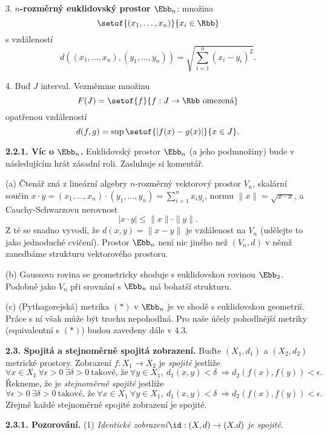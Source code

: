 \documentclass[12pt]{article}
\begin{document}
{ \smallskip
 
 3. {\bf $n$-rozměrný euklidovský prostor $\Ebb_n$}: množina
 $$  
 \setof{(x_1,\dots,x_n)}{x_i\in\Rbb}
 $$
  s vzdáleností
 \begin{equation}
 d((x_1,\dots,x_n),(y_1,\dots,y_n))=\sqrt{\sum_{i=1}^n(x_i-y_i)^2}. \tag{$*$}
 \end{equation}
 
 \smallskip
 
 4. Buď $J$ interval. Vezměmme množinu
 $$
 F(J)=\setof{f}{f:J\to\Rbb\ \text{omezená}}
 $$
 opatřenou vzdáleností
 $$
 d(f,g)=\sup\setof{|f(x)-g(x)|}{x\in J}.
 $$
 
 \medskip
 
 {\bf 2.2.1. Víc o $\Ebb_n$.} Euklidovský prostor $\Ebb_n$ (a jeho podmnožiny) bude
 v následujícím hrát zásadní roli. Zasluhuje si komentář.
 
 (a) Čtenář zná z lineární algebry $n$-rozměrný vektorový prostor $V_n$, skalární součin
 $x\cdot y=(x_1,\dots,x_n)\cdot(y_1,\dots,y_n)=\sum_{i=1}^nx_iy_i$, normu $\|x\|=\sqrt{x\cdot x}$, a Cauchy-Schwarzovu nerovnost
 $$
 |x\cdot y|\leq\|x\|\cdot\|y\|.
 $$
 Z té se snadno vyvodí, že $d(x,y)=\|x-y\|$ je vzdálenost na $V_n$ (udělejte to jako jednoduché cvičení).
 Prostor $\Ebb_n$ není nic jiného než $(V_n,d)$ v němž zanedbáme strukturu vektorového prostoru.
 
 (b) Gaussova rovina se geometricky shoduje s euklidovskou rovinou $\Ebb_2$. Podobně jako $V_n$ při srovnání s $\Ebb_n$ 
 má bohatší strukturu.
 
 (c) (Pythagorejská) metrika $(*)$ v $\Ebb_n$ je ve shodě s  euklidovskou geometrií. Práce s ní však může být trochu nepohodlná. Pro naše účely pohodlnější metriky (equivalentní s $(*)$) budou zavedeny dále v  4.3. 

 
 \bigskip
 
 {\bf 2.3. Spojitá a stejnoměrně spojitá zobrazení.} Buďte $(X_1,d_1)$ a $(X_2,d_2)$ metrické prostory. Zobrazení $f:X_1\to X_2$ je {\em spojité} jestliže
 $$
 \forall x\in X_1\ \forall\epsilon>0 \ \exists \delta>0\ \text{takové, že}\ \forall y\in X_1, \ 
 d_1(x,y)<\delta\ \Rightarrow d_2(f(x),f(y))<\epsilon.
 $$
Řekneme, že je {\em stejnoměrně spojité} jestliže
$$
  \forall\epsilon>0 \ \exists \delta>0\ \text{takové, že}\ \forall x\in X_1\  \forall y\in X_1, \ 
 d_1(x,y)<\delta\ \Rightarrow d_2(f(x),f(y))<\epsilon.
 $$
 Zřejmě každé stejnoměrně spojité zobrazení je spojité.
 
 \medskip
 
 {\bf 2.3.1. Pozorování.} (1) {\em Identické zobrazení$\id:(X,d)\to(X.d)$ je spojité.}
 
}
\end{document}
